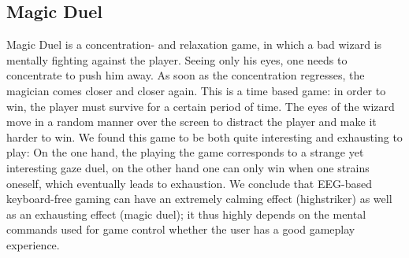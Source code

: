 \documentclass{utue} %
\begin{document}
\subsection{Magic Duel}

Magic Duel is a concentration- and relaxation game, in which a bad wizard is mentally fighting against the player. Seeing only his eyes, one needs to concentrate to push him away. As soon as the concentration regresses, the magician comes closer and closer again. This is a time based game: in order to win, the player must survive for a certain period of time. The eyes of the wizard move in a random manner over the screen to distract the player and make it harder to win. We found this game to be both quite interesting and exhausting to play: On the one hand, the playing the game corresponds to a strange yet interesting gaze duel, on the other hand one can only win when one strains oneself, which eventually leads to exhaustion. We conclude that EEG-based keyboard-free gaming can have an extremely calming effect (highstriker) as well as an exhausting effect (magic duel); it thus highly depends on the mental commands used for game control whether the user has a good gameplay experience.
\end{document}
